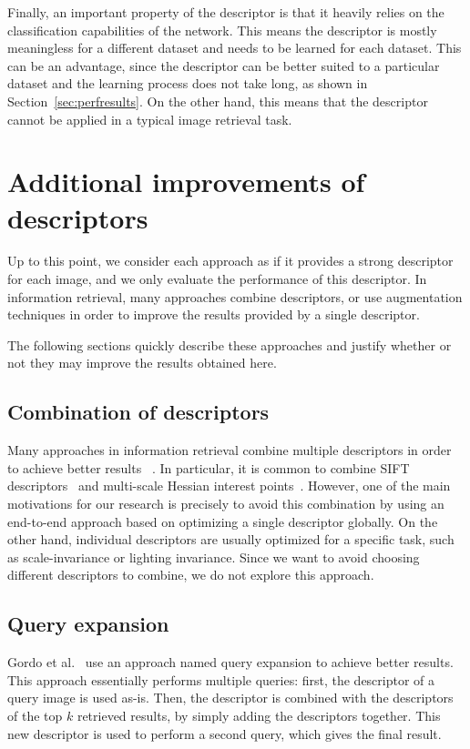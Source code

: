 Finally, an important property of the descriptor is that it
heavily relies on the classification
capabilities of the network. This means the descriptor is
mostly meaningless for a different dataset and needs
to be learned for each dataset. This can be an advantage,
since the descriptor can be better suited to a particular
dataset and the learning process does not take long, as shown
in Section~\ref{sec:perfresults}. On the other hand, this means that
the descriptor cannot be applied in a typical image retrieval
task.

\section{Additional improvements of descriptors}
Up to this point, we consider each approach
as if it provides a strong descriptor for each image, and we only
evaluate the performance of this descriptor.
In information retrieval, many approaches combine descriptors,
or use augmentation techniques in order to improve the results
provided by a single descriptor.

The following sections quickly describe these approaches and
justify whether or not they may improve the results obtained
here.

\subsection{Combination of descriptors}
Many approaches in information retrieval combine multiple
descriptors in order to achieve better results
~\cite{philbin_lost_2008,jegou_accurate_2010,chum_total_2007}.
In particular,
it is common to combine SIFT descriptors~\cite{lowe_distinctive_2004}
and multi-scale Hessian interest points~\cite{mikolajczyk_scale_2004}.
However, one of the main motivations for our research is precisely to avoid
this combination by using an end-to-end approach based
on optimizing a single descriptor globally. On the other hand,
individual descriptors are usually optimized for
a specific task, such as scale-invariance or lighting invariance.
Since we want to avoid choosing
different descriptors to combine, we do not explore this approach.

\subsection{Query expansion}
Gordo et al.~\cite{gordo_end--end_2016} use an approach
named query expansion to achieve better results. This
approach essentially performs multiple queries: first, the
descriptor of a query image is used as-is. Then, the descriptor
is combined with the descriptors of the top $k$ retrieved
results, by simply adding the descriptors together. This new
descriptor is used to perform a second query, which gives
the final result.

